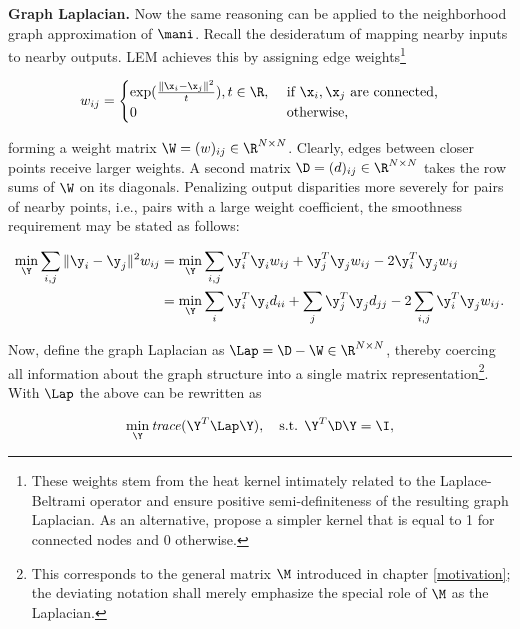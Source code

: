 \textbf{Graph Laplacian.}
Now the same reasoning can be applied to the neighborhood graph approximation of
$\mani$.
Recall the desideratum of mapping nearby inputs to nearby 
outputs.
LEM achieves this by assigning edge weights\footnote{
These weights stem from the heat kernel intimately related to the 
Laplace-Beltrami operator and ensure positive semi-definiteness of the resulting
graph Laplacian. 
As an alternative, \citet{belkinniyogi2003} propose a simpler kernel that is 
equal to 1 for connected nodes and 0 otherwise.
}

\begin{equation*}
  w_{ij} = \begin{cases}
    \exp(\frac{\|\x_i - \x_j \|^2}{t}), t \in \R, & \mbox{ if } \x_i, \x_j
    \text{ are connected,} \\
    0 & \mbox{ otherwise,}
  \end{cases}
\end{equation*}

forming a weight matrix $\W = (w)_{ij} \in \R^{N \times N}$.
Clearly, edges between closer points receive larger weights.
A second matrix $\D = (d)_{ij} \in \R^{N \times N}$ takes the row
sums of $\W$ on its diagonals.
Penalizing output disparities more severely for pairs of nearby points, i.e.,
pairs with a large weight coefficient, the smoothness requirement may be stated
as follows:

\begin{equation*}
  \begin{split}
    \min_{\Y} \sum_{i, j} \| \y_i - \y_j \|^2 w_{ij}
    &= \min_{\Y} \sum_{i, j} \y_i^T \y_i w_{ij} + \y_j^T \y_j
    w_{ij} -
    2 \y_i^T \y_j w_{ij} \\
    &= \min_{\Y} \sum_i \y_i^T \y_i d_{ii} + \sum_j \y_j^T \y_j
    d_{jj} - 2 \sum_{i, j} \y_i^T \y_j w_{ij}.
  \end{split}
\end{equation*}

Now, define the graph Laplacian as
$\Lap = \D - \W \in \R^{N \times N}$, thereby coercing
all information about the graph structure into a single matrix
representation\footnote{
This corresponds to the general matrix $\M$ introduced in chapter
\ref{motivation}; the deviating notation shall merely emphasize the special
role of $\M$ as the Laplacian.}.
With $\Lap$ the above can be rewritten as

\begin{equation}
  \min_{\Y} \text{\textit{trace}}(\Y^T \Lap \Y), \quad \text{s.t. } 
  \Y^T \D \Y = \I,
  \label{eq-obj-lem}
\end{equation}

